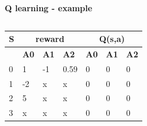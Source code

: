 \documentclass[xcolor=dvipsnames]{beamer}
\begin{document}
\begin{frame}{\bf Q learning - example}
\begin{columns}
\begin{column}{0.5\textwidth}
    {\footnotesize
        \begin{table}[]
        \begin{tabular}{|l|l|l|l|l|l|l|}
        \hline
        \textbf{S} & \multicolumn{3}{c|}{\textbf{reward}}   & \multicolumn{3}{c|}{\textbf{Q(s,a)}} \\ \hline
        \textbf{}  & \textbf{A0}       & \textbf{A1}        & \textbf{A2}       & \textbf{A0}       & \textbf{A1}      & \textbf{A2} \\ \hline
        0          & 1                 & -1                 & 0.59              & 0                 & 0                & 0 \\ \hline
        1          & -2                & x                  & x                 & 0                 & 0                & 0 \\ \hline
        2          & 5                 & x                  & x                 & 0                 & 0                & 0  \\ \hline
        3          & x                 & x                  & x                 & 0                 & 0                & 0 \\ \hline
        \end{tabular}
        \end{table}
    }
    \end{column}
\end{columns}

\end{frame}
\end{document}
